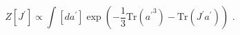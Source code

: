 \begin{equation}  \label{matrix2}
Z[J^{\prime}]\propto\int [d{a}^{\prime}] \exp\left( -\frac{1}{3}\mbox{Tr}({{a%
}^{\prime}}^3) - \mbox{Tr}( J^{\prime}{a}^{\prime}) \right)\,\,.
\end{equation}

